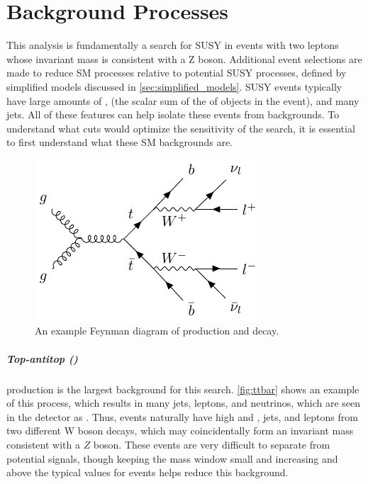 
\chapter{Background Processes} %

\label{ch:background_processes} 


This analysis is fundamentally a search for \acf{SUSY} in events with two leptons whose invariant mass is consistent with a Z boson. Additional event selections are made to reduce \acf{SM} processes relative to potential \ac{SUSY} processes, defined by simplified models discussed in \autoref{sec:simplified_models}. \ac{SUSY} events typically have large amounts of \MET, \HT (the scalar sum of the \pT of objects in the event), and many jets. All of these features can help isolate these events from backgrounds. To understand what cuts would optimize the sensitivity of the search, it is essential to first understand what these \ac{SM} backgrounds are. 

\begin{centering}
\begin{figure}[bth]
\myfloatalign
\includegraphics[width=.70\linewidth]{feynman/ttbar.pdf}
\caption{An example Feynman diagram of \ttbar production and decay.}
\label{fig:ttbar}
\end{figure}
\end{centering}

\paragraph{Top-antitop (\ttbar)} production is the largest background for this search. \autoref{fig:ttbar} shows an example of this process, which results in many jets, leptons, and neutrinos, which are seen in the detector as \MET. Thus, \ttbar events naturally have high \MET and \HT, jets, and leptons from two different W boson decays, which may coincidentally form an invariant mass consistent with a $Z$ boson. These events are very difficult to separate from potential signals, though keeping the mass window small and increasing \MET and \HT above the typical values for \ttbar events helps reduce this background.

